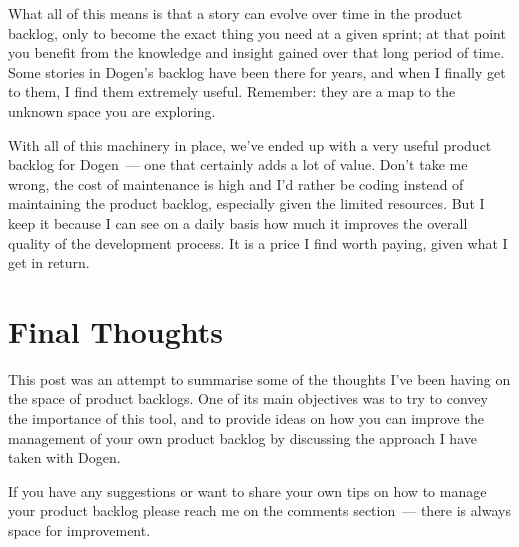 \documentclass{book}
\begin{document}
What all of this means is that a story can evolve over time in the
product backlog, only to become the exact thing you need at a given
sprint; at that point you benefit from the knowledge and insight
gained over that long period of time. Some stories in Dogen's backlog
have been there for years, and when I finally get to them, I find them
extremely useful. Remember: they are a map to the unknown space you
are exploring.

With all of this machinery in place, we've ended up with a very useful
product backlog for Dogen~--- one that certainly adds a lot of
value. Don't take me wrong, the cost of maintenance is high and I'd
rather be coding instead of maintaining the product backlog,
especially given the limited resources. But I keep it because I can
see on a daily basis how much it improves the overall quality of the
development process. It is a price I find worth paying, given what I
get in return.

\section{Final Thoughts}

This post was an attempt to summarise some of the thoughts I've been
having on the space of product backlogs. One of its main objectives
was to try to convey the importance of this tool, and to provide ideas
on how you can improve the management of your own product backlog by
discussing the approach I have taken with Dogen.

If you have any suggestions or want to share your own tips on how to
manage your product backlog please reach me on the comments
section~--- there is always space for improvement.



\end{document}
